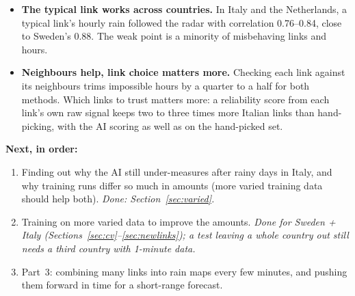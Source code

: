 \begin{itemize}
\item \textbf{The typical link works across countries.} In Italy and the Netherlands, a typical link's hourly rain followed the
radar with correlation 0.76--0.84, close to Sweden's 0.88. The weak point is a minority of misbehaving links and hours.
\item \textbf{Neighbours help, link choice matters more.} Checking each link against its neighbours trims impossible hours
by a quarter to a half for both methods. Which links to trust matters more: a reliability score from each link's own raw
signal keeps two to three times more Italian links than hand-picking, with the AI scoring as well as on the hand-picked
set.
\end{itemize}

\textbf{Next, in order:}
\begin{enumerate}
\item Finding out why the AI still under-measures after rainy days in Italy, and why training runs differ so much in
amounts (more varied training data should help both). \emph{Done: Section~\ref{sec:varied}.}
\item Training on more varied data to improve the amounts. \emph{Done for Sweden + Italy (Sections~\ref{sec:cv}--\ref{sec:newlinks}); a test
leaving a whole country out still needs a third country with 1-minute data.}
\item Part~3: combining many links into rain maps every few minutes, and pushing them forward in time for a short-range
forecast.
\end{enumerate}
